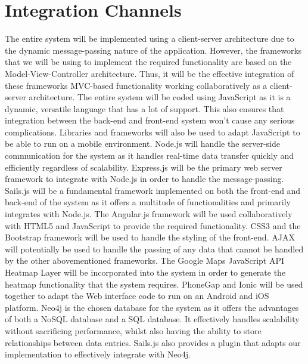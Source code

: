 \documentclass[11pt,fleqn]{book} %
\begin{document}
	\section{Integration Channels}\newline
	The entire system will be implemented using a client-server architecture due to the dynamic message-passing nature of the application. However, the frameworks that we will be using to implement the required functionality are based on the Model-View-Controller architecture. Thus, it will be the effective integration of these frameworks MVC-based functionality working collaboratively as a client-server architecture. The entire system will be coded using JavaScript as it is a dynamic, versatile language that has a lot of support. This also ensures that integration between the back-end and front-end system won’t cause any serious complications. Libraries and frameworks will also be used to adapt JavaScript to be able to run on a mobile environment.\newline\newline
	Node.js will handle the server-side communication for the system as it handles real-time data transfer quickly and efficiently regardless of scalability. Express.js will be the primary web server framework to integrate with Node.js in order to handle the message-passing. Sails.js will be a fundamental framework implemented on both the front-end and back-end of the system as it offers a multitude of functionalities and primarily integrates with Node.js. The Angular.js framework will be used collaboratively with HTML5 and JavaScript to provide the required functionality. CSS3 and the Bootstrap framework will be used to handle the styling of the front-end. AJAX will potentially be used to handle the passing of any data that cannot be handled by the other abovementioned frameworks. The Google Maps JavaScript API Heatmap Layer will be incorporated into the system in order to generate the heatmap functionality that the system requires. PhoneGap and Ionic will be used together to adapt the Web interface code to run on an Android  and iOS platform.\newline\newline
	Neo4j is the chosen database for the system as it offers the advantages of both a NoSQL database and a SQL database. It effectively handles scalability without sacrificing performance, whilst also having the ability to store relationships between data entries. Sails.js also provides a plugin that adapts our implementation to effectively integrate with Neo4j.
	
\end{document}
